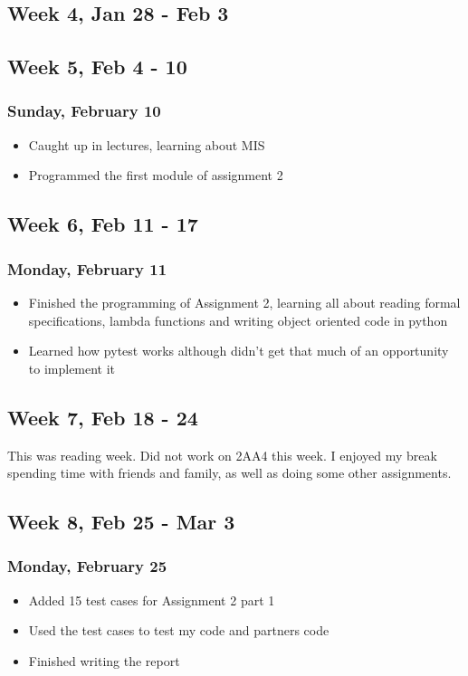 \documentclass{article}
\begin{document}
\subsection{Week 4, Jan 28 - Feb 3}

\subsection{Week 5, Feb 4 - 10}

\subsubsection{Sunday, February 10}
\begin{itemize}
    \item Caught up in lectures, learning about MIS
    \item Programmed the first module of assignment 2
\end{itemize}

\subsection{Week 6, Feb 11 - 17}

\subsubsection{Monday, February 11}
\begin{itemize}
    \item Finished the programming of Assignment 2, learning all about reading formal specifications, lambda functions and writing object oriented code in python
    \item Learned how pytest works although didn't get that much of an opportunity to implement it
\end{itemize}

\subsection{Week 7, Feb 18 - 24}

This was reading week. Did not work on 2AA4 this week. I enjoyed my break spending time with friends and family, as well as doing some other assignments.

\subsection{Week 8, Feb 25 - Mar 3}

\subsubsection{Monday, February 25}
\begin{itemize}
    \item Added 15 test cases for Assignment 2 part 1
    \item Used the test cases to test my code and partners code
    \item Finished writing the report
\end{itemize}
\end{document}
